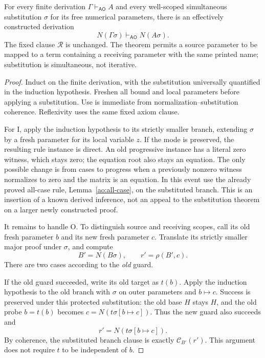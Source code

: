 \begin{theorem}
\label{ao:substitution}
For every finite derivation $\Gamma\vdash_{\mathsf{AO}}A$ and every
well-scoped simultaneous substitution $\sigma$ for its free numerical
parameters, there is an effectively constructed derivation
\[
            N(\Gamma\sigma)\vdash_{\mathsf{AO}}N(A\sigma).
\]
The fixed clause $\mathcal R$ is unchanged.  The theorem permits a source
parameter to be mapped to a term containing a receiving parameter with
the same printed name; substitution is simultaneous, not iterative.
\end{theorem}
\begin{proof}
Induct on the finite derivation, with the substitution universally
quantified in the induction hypothesis.  Freshen all bound and local
parameters before applying a substitution.  Use is immediate from
normalization--substitution coherence.  Reflexivity uses the same fixed
axiom clause.

For I, apply the induction hypothesis to its strictly smaller branch,
extending $\sigma$ by a fresh parameter for its local variable $z$.
If the mode is preserved, the resulting rule instance is direct.  An
old progressive instance has a literal zero witness, which stays zero;
the equation root also stays an equation.  The only possible change is
from cases to progress when a previously nonzero witness normalizes to
zero and the matrix is an equation.  In this event use the already proved
all-case rule, Lemma~\ref{ao:all-case}, on the substituted branch.
This is an insertion of a known derived inference, not an appeal to the
substitution theorem on a larger newly constructed proof.

It remains to handle O.  To distinguish source and receiving scopes,
call its old fresh parameter $b$ and its new fresh parameter $c$.
Translate its strictly smaller major proof under $\sigma$, and compute
\[
  B'=N(B\sigma),\qquad r'=\rho(B',c).
\]
There are two cases according to the \emph{old} guard.

If the old guard succeeded, write its old target as $t(b)$.  Apply the
induction hypothesis to the old branch with $\sigma$ on outer parameters
and $b\mapsto c$.  Success is preserved under this protected substitution:
the old base $H$ stays $H$, and the old probe $b=t(b)$ becomes
$c=N(t\sigma[b\mapsto c])$.  Thus the new guard also succeeds and
\[
 r'=N(t\sigma[b\mapsto c]).
\]
By coherence, the substituted branch clause is exactly
$\mathcal C_{B'}(r')$.  This argument does not require $t$ to be
independent of $b$.


\end{proof}
